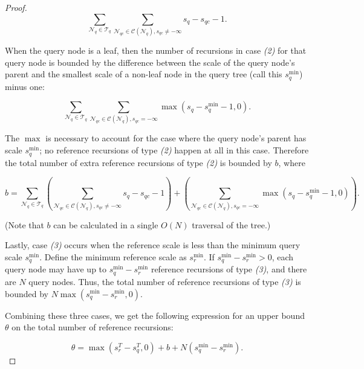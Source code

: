 \begin{proof}
\begin{equation}
\sum_{\mathscr{N}_q \in \mathscr{T}_q} \sum_{\mathscr{N}_{qc} \in
\mathscr{C}(\mathscr{N}_q), s_{qc} \ne -\infty} s_q - s_{qc} - 1.
\end{equation}

When the query node is a leaf, then the number of recursions in case
\textit{(2)} for that query node is bounded by the difference between the scale
of the query node's parent and the smallest scale of a non-leaf node in the
query tree (call this $s_q^{\min}$) minus one:

\begin{equation}
\sum_{\mathscr{N}_q \in \mathscr{T}_q} \sum_{\mathscr{N}_{qc} \in
\mathscr{C}(\mathscr{N}_q), s_{qc} = -\infty} \max(s_q - s_q^{\min} - 1, 0).
\end{equation}

The $\max$ is necessary to account for the case where the query node's parent
has scale $s_q^{\min}$; no reference recursions of type \textit{(2)} happen at
all in this case.  Therefore the total number of extra reference recursions of
type \textit{(2)} is bounded by $b$, where

\begin{equation}
b = \sum_{\mathscr{N}_q \in \mathscr{T}_q} \left(\sum_{\mathscr{N}_{qc} \in
\mathscr{C}(\mathscr{N}_q), s_{qc} \ne -\infty} s_q - s_{qc} - 1 \right) +
\left(\sum_{\mathscr{N}_{qc} \in \mathscr{C}(\mathscr{N}_q), s_{qc} = -\infty}
\max(s_q - s_q^{\min} - 1, 0) \right).
\end{equation}

(Note that $b$ can be calculated in a single $O(N)$ traversal of the tree.)

Lastly, case \textit{(3)} occurs when the reference scale is less than the
minimum query scale $s_q^{\min}$.  Define the minimum reference scale as
$s_r^{\min}$.  If $s_q^{\min} - s_r^{\min} > 0$, each query node may have up to
$s_q^{\min} - s_r^{\min}$ reference recursions of type \textit{(3)}, and there
are $N$ query nodes.  Thus, the total number of reference recursions of type
\textit{(3)} is bounded by $N \max(s_q^{\min} - s_r^{\min}, 0)$.

Combining these three cases, we get the following expression for an upper bound
$\theta$ on the total number of reference recursions:

\begin{equation}
\theta = \max(s_r^T - s_q^T, 0) + b + N (s_q^{\min} - s_r^{\min}).
\end{equation}


\end{proof}
